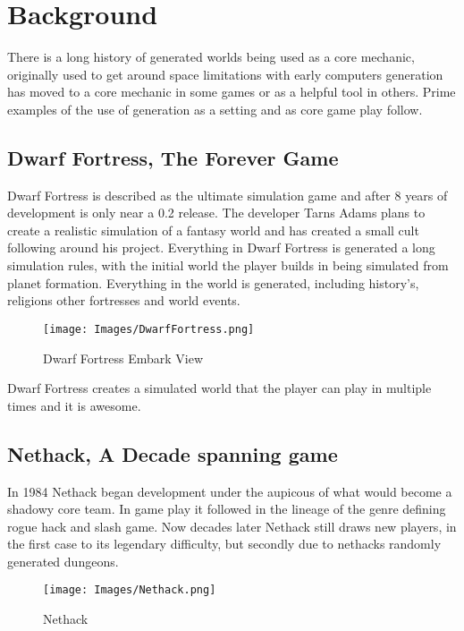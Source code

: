 \section{Background}
There is a long history of generated worlds being used as a core mechanic, 
originally used to get around space limitations with early computers generation
has moved to a core mechanic in some games or as a helpful tool in others. Prime
examples of the use of generation as a setting and as core game play follow.\\

\subsection*{Dwarf Fortress, The Forever Game}
Dwarf Fortress is described as the ultimate simulation game and after 8 years of
development is only near a 0.2 release. The developer Tarns Adams plans to create
a realistic simulation of a fantasy world and has created a small cult following
around his project. Everything in Dwarf Fortress is generated a long simulation
rules, with the initial world the player builds in being simulated from planet 
formation. Everything in the world is generated, including history's, religions
other fortresses and world events. \\


\begin{figure}[h!]
  \texttt{[image: Images/DwarfFortress.png]}
  \caption{Dwarf Fortress Embark View}
\end{figure}

Dwarf Fortress creates a simulated world that the player can play in multiple 
times and it is awesome.\\

\subsection*{Nethack, A Decade spanning game}
In 1984 Nethack began development under the aupicous of what would become a 
shadowy core team. In game play it followed in the lineage of the genre defining
rogue hack and slash game. Now decades later Nethack still draws new players,
in the first case to its legendary difficulty, but secondly due to nethacks 
randomly generated dungeons.\\ 

\begin{figure}[h!]
  \texttt{[image: Images/Nethack.png]}
  \caption{Nethack}
\end{figure}

